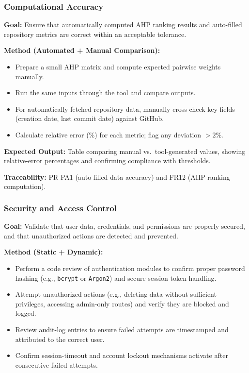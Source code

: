 \documentclass[12pt, titlepage]{article}
\begin{document}
\subsubsection{Computational Accuracy}
\label{subsubsec:accuracy}

\textbf{Goal:} Ensure that automatically computed AHP ranking results and auto-filled repository metrics are correct within an acceptable tolerance.

\textbf{Method (Automated + Manual Comparison):}
\begin{itemize}
  \item Prepare a small AHP matrix and compute expected pairwise weights manually.
  \item Run the same inputs through the tool and compare outputs.
  \item For automatically fetched repository data, manually cross-check key fields (creation date, last commit date) against GitHub.
  \item Calculate relative error (\%) for each metric; flag any deviation \(> 2\%\).
\end{itemize}

\textbf{Expected Output:} Table comparing manual vs.\ tool-generated values, showing relative-error percentages and confirming compliance with thresholds.

\textbf{Traceability:} PR-PA1 (auto-filled data accuracy) and FR12 (AHP ranking computation).

\subsubsection{Security and Access Control}
\label{subsubsec:security}

\textbf{Goal:} Validate that user data, credentials, and permissions are properly secured, and that unauthorized actions are detected and prevented.

\textbf{Method (Static + Dynamic):}
\begin{itemize}
  \item Perform a code review of authentication modules to confirm proper password hashing (e.g., \texttt{bcrypt} or \texttt{Argon2}) and secure session-token handling.
  \item Attempt unauthorized actions (e.g., deleting data without sufficient privileges, accessing admin-only routes) and verify they are blocked and logged.
  \item Review audit-log entries to ensure failed attempts are timestamped and attributed to the correct user.
  \item Confirm session-timeout and account lockout mechanisms activate after consecutive failed attempts.
\end{itemize}
\end{document}
